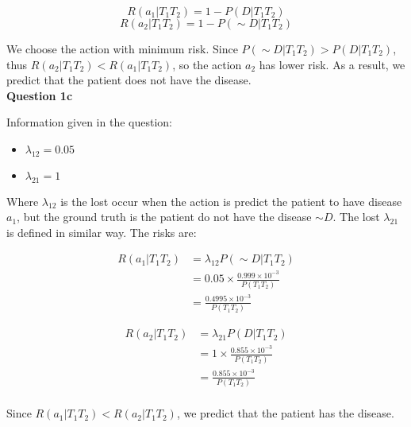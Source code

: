 \documentclass[11pt,a4paper]{report}
\begin{document}
\begin{multicols*}{2}
$$R(a_1|T_1 T_2) = 1 - P( D | T_1 T_2)$$
$$R(a_2|T_1 T_2) = 1 - P( \sim D | T_1 T_2)$$

\noindent We choose the action with minimum risk. Since $P(\sim D|T_1 T_2) > P(D|T_1 T_2)$, thus $R(a_2|T_1 T_2) < R(a_1|T_1 T_2)$, so the action $a_2$ has lower risk. As a result, we predict that the patient does not have the disease.\\

\noindent \textbf{Question 1c}

\noindent Information given in the question:
\begin{itemize}
  \item $\lambda_{12} = 0.05$
  \item $\lambda_{21} = 1$
\end{itemize}

\noindent Where $\lambda_{12}$ is the lost occur when the action is predict the patient to have disease $a_1$, but the ground truth is the patient do not have the disease $\sim D$. The lost $\lambda_{21}$ is defined in similar way. The risks are:

\begin{equation*}
\begin{split}
R(a_1|T_1 T_2) &= \lambda_{12} P(\sim D | T_1 T_2)\\
&= 0.05 \times \frac{0.999 \times 10^{-3}}{P(T_1 T_2)}\\
&= \frac{0.4995 \times 10^{-3}}{P(T_1 T_2)}
\end{split}
\end{equation*}

\begin{equation*}
\begin{split}
R(a_2|T_1 T_2) &= \lambda_{21} P( D | T_1 T_2)\\
&= 1 \times \frac{0.855 \times 10^{-3}}{P(T_1 T_2)}\\
&= \frac{0.855 \times 10^{-3}}{P(T_1 T_2)}\\
\end{split}
\end{equation*}

\noindent Since $R(a_1|T_1 T_2) < R(a_2|T_1 T_2)$, we predict that the patient has the disease.

\end{multicols*} 
\end{document}
